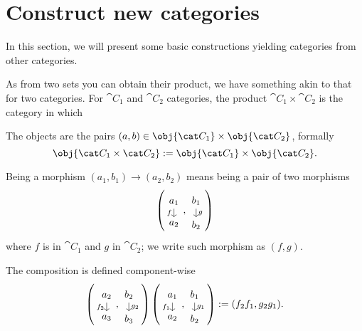 
\section{Construct new categories}

In this section, we will present some basic constructions yielding categories from other categories.

As from two sets you can obtain their product, we have something akin to that for two categories. For \(\cat C_1\) and \(\cat C_2\) categories, the product \(\cat C_1 \times \cat C_2\) is the category in which
\begin{tcbitem}
\item The objects are the pairs \((a, b) \in \obj{\cat C_1} \times \obj{\cat C_2}\), formally
\[\obj{\cat C_1 \times \cat C_2} := \obj{\cat C_1} \times \obj{\cat C_2}.\]
\item Being a morphism \((a_1, b_1) \to (a_2, b_2)\) means being a pair of two morphisms
\[\left(\begin{tikzcd}[row sep=small] a_1 \ar["f", d, swap] \\ a_2 \end{tikzcd}, \begin{tikzcd}[row sep=small] b_1 \ar["g", d] \\ b_2 \end{tikzcd}\right)\]
where \(f\) is in \(\cat C_1\) and \(g\) in \(\cat C_2\); we write such morphism as \(\left(f, g\right)\).
\item The composition is defined component-wise
\[\left(\begin{tikzcd}[row sep=small] a_2 \ar["f_2", d, swap] \\ a_3 \end{tikzcd}, \begin{tikzcd}[row sep=small] b_2 \ar["g_2", d] \\ b_3 \end{tikzcd}\right) \left(\begin{tikzcd}[row sep=small] a_1 \ar["f_1", d, swap] \\ a_2 \end{tikzcd}, \begin{tikzcd}[row sep=small] b_1 \ar["g_1", d] \\ b_2 \end{tikzcd}\right) := (f_2 f_1, g_2 g_1) .\]
\end{tcbitem}

